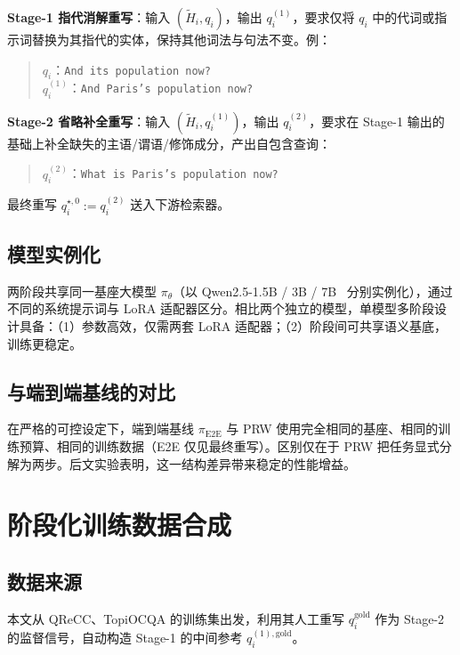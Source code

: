 \textbf{Stage-1 指代消解重写}：输入 $(\tilde H_i, q_i)$，输出 $q_i^{(1)}$，要求仅将 $q_i$ 中的代词或指示词替换为其指代的实体，保持其他词法与句法不变。例：

\begin{quote}
$q_i$：\texttt{And its population now?}\\
$q_i^{(1)}$：\texttt{And Paris's population now?}
\end{quote}

\textbf{Stage-2 省略补全重写}：输入 $(\tilde H_i, q_i^{(1)})$，输出 $q_i^{(2)}$，要求在 Stage-1 输出的基础上补全缺失的主语/谓语/修饰成分，产出自包含查询：
\begin{quote}
$q_i^{(2)}$：\texttt{What is Paris's population now?}
\end{quote}

最终重写 $q_i^{\star,0} := q_i^{(2)}$ 送入下游检索器。

\subsection{模型实例化}

两阶段共享同一基座大模型 $\pi_\theta$（以 Qwen2.5-1.5B / 3B / 7B~\citep{qwen2025qwen25technicalreport} 分别实例化），通过不同的系统提示词与 LoRA 适配器区分。相比两个独立的模型，单模型多阶段设计具备：（1）参数高效，仅需两套 LoRA 适配器；（2）阶段间可共享语义基底，训练更稳定。

\subsection{与端到端基线的对比}

在严格的可控设定下，端到端基线 $\pi_{\text{E2E}}$ 与 PRW 使用完全相同的基座、相同的训练预算、相同的训练数据（E2E 仅见最终重写）。区别仅在于 PRW 把任务显式分解为两步。后文实验表明，这一结构差异带来稳定的性能增益。

\section{阶段化训练数据合成}
\label{sec:prw_data}

\subsection{数据来源}

本文从 QReCC、TopiOCQA 的训练集出发，利用其人工重写 $q_i^{\text{gold}}$ 作为 Stage-2 的监督信号，自动构造 Stage-1 的中间参考 $q_i^{(1),\text{gold}}$。

